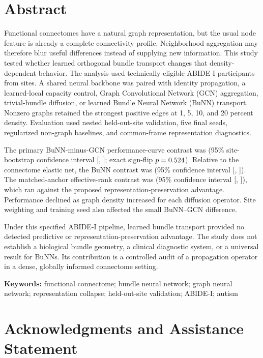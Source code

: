 \documentclass[11pt,a4paper]{article}
\begin{document}
\section*{Abstract}

Functional connectomes have a natural graph representation, but the usual
node feature is already a complete connectivity profile. Neighborhood
aggregation may therefore blur useful differences instead of supplying new
information. This study tested whether learned orthogonal bundle transport
changes that density-dependent behavior. The analysis used
\StudyParticipants{} technically eligible ABIDE-I participants from
\StudySites{} sites. A shared neural backbone was paired with identity
propagation, a learned-local capacity control, Graph Convolutional Network
(GCN) aggregation, trivial-bundle diffusion, or learned Bundle Neural Network
(BuNN) transport. Nonzero graphs retained the strongest positive edges at 1,
5, 10, and 20 percent density. Evaluation used nested held-out-site validation,
five final seeds, regularized non-graph baselines, and common-frame
representation diagnostics.

The primary BuNN-minus-GCN performance-curve contrast was
\BunnGcnEstimate{} (95\% site-bootstrap confidence interval
[\BunnGcnCILow{}, \BunnGcnCIHigh{}]; exact sign-flip
$p=0.524$). Relative to the connectome elastic net, the BuNN contrast was
\BunnElasticEstimate{} (95\% confidence interval
[\BunnElasticCILow{}, \BunnElasticCIHigh{}]). The matched-anchor
effective-rank contrast was \RankEstimate{} (95\% confidence interval
[\RankCILow{}, \RankCIHigh{}]), which ran against the proposed
representation-preservation advantage. Performance declined as graph density
increased for each diffusion operator. Site weighting and training seed also
affected the small BuNN--GCN difference.

Under this specified ABIDE-I pipeline, learned bundle transport provided no
detected predictive or representation-preservation advantage. The study does
not establish a biological bundle geometry, a clinical diagnostic system, or
a universal result for BuNNs. Its contribution is a controlled audit of a
propagation operator in a dense, globally informed connectome setting.

\noindent\textbf{Keywords:} functional connectome; bundle neural network;
graph neural network; representation collapse; held-out-site validation;
ABIDE-I; autism

\clearpage
\section*{Acknowledgments and Assistance Statement}
\end{document}
